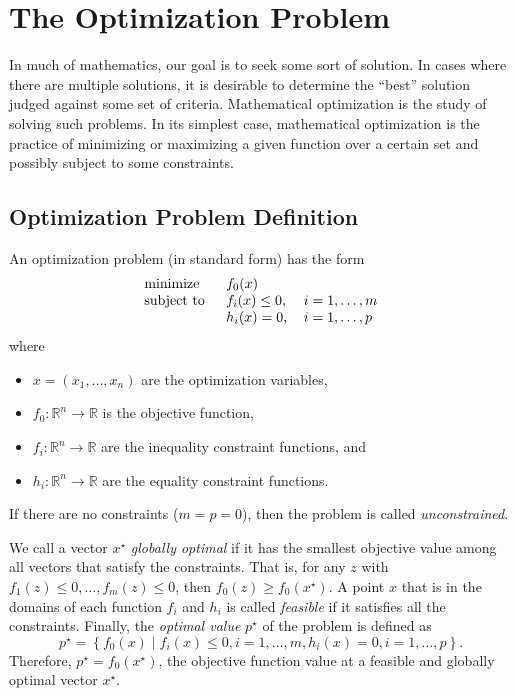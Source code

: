 \section{The Optimization Problem}

In much of mathematics, our goal is to seek some sort of solution. In cases where there are multiple solutions, it is desirable to determine the ``best'' solution judged against some set of criteria. Mathematical optimization is the study of solving such problems. In its simplest case, mathematical optimization is the practice of minimizing or maximizing a given function over a certain set and possibly subject to some constraints.
\subsection{Optimization Problem Definition}
\begin{defn}
	An optimization problem (in standard form) has the form
	\begin{equation}
		\begin{tabular}{lll}
			\text{minimize }   & $f_0(x)$        &                 \\
			\text{subject to } & $f_i(x)\leq 0$, & $i=1,\ldots, m$ \\
			& $h_i(x) = 0$,   & $i=1,\ldots, p$ 
		\end{tabular}\label{Optimization}
	\end{equation}
	where
	\begin{itemize}
		\item $x=\left(x_1,\ldots,x_n\right)$ are the optimization variables,
		\item $f_0 : \mathbb{R}^n\rightarrow\mathbb{R}$ is the objective function,
		\item $f_i : \mathbb{R}^n\rightarrow\mathbb{R}$ are the inequality constraint functions, and
		\item $h_i : \mathbb{R}^n\rightarrow\mathbb{R}$ are the equality constraint functions.
	\end{itemize}
\end{defn}
If there are no constraints ($m=p=0$), then the problem is called \textit{unconstrained}. \cite[p. 127]{Boyd2004}

We call a vector $x^\star$ \textit{globally optimal} if it has the smallest objective value among all vectors that satisfy the constraints. That is, for any $z$ with $f_1(z)\leq 0,\ldots, f_m(z)\leq 0$, then $f_0(z)\geq f_0(x^\star)$. A point $x$ that is in the domains of each function $f_i$ and $h_i$ is called \textit{feasible} if it satisfies all the constraints. Finally, the \textit{optimal value} $p^\star$ of the problem is defined as $$p^\star=\left\lbrace f_0(x) \mid f_i(x)\leq 0, i=1,\ldots,m, h_i(x)=0, i=1,\ldots,p\right\rbrace.$$ Therefore, $p^{\star}=f_0(x^\star)$, the objective function value at a feasible and globally optimal vector $x^{\star}$.

